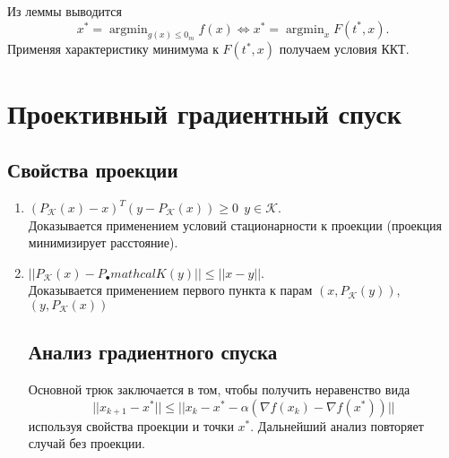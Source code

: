 \documentclass[10pt,a4paper]{article}
\DeclareMathOperator{\argmin}{argmin}
\begin{document}
Из леммы выводится
$$
x^*=\argmin_{g(x)\leq 0_m}f(x)\Leftrightarrow x^*=\argmin_x F(t^*, x).
$$
Применяя характеристику минимума к $F(t^*, x)$ получаем условия ККТ.

\section{Проективный градиентный спуск}
\subsection{Свойства проекции}
\begin{enumerate}
\item $(P_\mathcal{K}(x)-x)^T(y-P_\mathcal{K}(x))\geq 0~~y\in \mathcal{K}$.\\
Доказывается применением условий стационарности к проекции (проекция минимизирует расстояние).
\item $||P_\mathcal{K}(x)-P_\mathcal{•}mathcal{K}(y)||\leq ||x-y||$.\\
Доказывается применением первого пункта к парам $(x, P_\mathcal{K}(y))$, $(y, P_\mathcal{K}(x))$

\subsection{Анализ градиентного спуска}
Основной трюк заключается в том, чтобы получить неравенство вида
$$
||x_{k+1}-x^*||\leq ||x_k-x^*-\alpha(\nabla f(x_k)-\nabla f(x^*))||
$$
используя свойства проекции и точки $x^*$. Дальнейший анализ повторяет случай без проекции. 
\end{enumerate}
\end{document}
